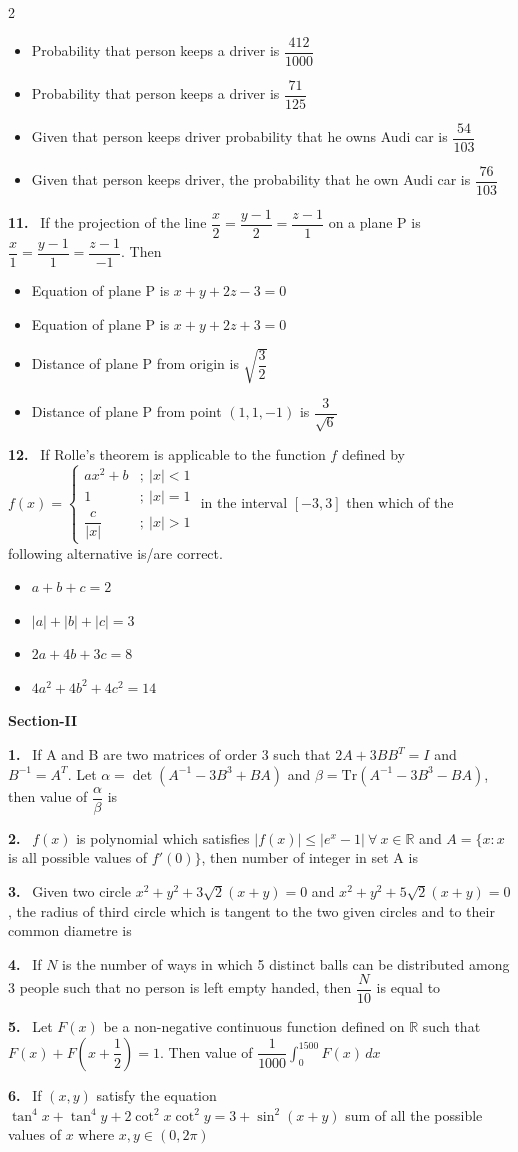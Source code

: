 \documentclass[10pt]{extarticle}
\newcommand{\sect}[1]{\par\smallskip\noindent\textbf{#1}\par}
\newcommand{\qn}[1]{\par\smallskip\noindent\textbf{#1.}~}
\newenvironment{qoptions}{\begin{itemize}[leftmargin=1.8em,itemsep=1pt,topsep=2pt,label={}]}{\end{itemize}}
\newcommand{\opt}[2]{\item[(#1)] #2}
\begin{document}
\begin{multicols}{2}
\begin{qoptions}
\opt{A}{Probability that person keeps a driver is $\dfrac{412}{1000}$}
\opt{B}{Probability that person keeps a driver is $\dfrac{71}{125}$}
\opt{C}{Given that person keeps driver probability that he owns Audi car is $\dfrac{54}{103}$}
\opt{D}{Given that person keeps driver, the probability that he own Audi car is $\dfrac{76}{103}$}
\end{qoptions}
\qn{11} If the projection of the line $\dfrac x2=\dfrac{y-1}{2}=\dfrac{z-1}{1}$ on a plane P is $\dfrac x1=\dfrac{y-1}{1}=\dfrac{z-1}{-1}$. Then
\begin{qoptions}
\opt{A}{Equation of plane P is $x+y+2z-3=0$}
\opt{B}{Equation of plane P is $x+y+2z+3=0$}
\opt{C}{Distance of plane P from origin is $\sqrt{\dfrac32}$}
\opt{D}{Distance of plane P from point $(1,1,-1)$ is $\dfrac{3}{\sqrt6}$}
\end{qoptions}
\qn{12} If Rolle's theorem is applicable to the function $f$ defined by $f(x)=\begin{cases}ax^2+b&;\ |x|<1\\ 1&;\ |x|=1\\ \dfrac{c}{|x|}&;\ |x|>1\end{cases}$ in the interval $[-3,3]$ then which of the following alternative is/are correct.
\begin{qoptions}
\opt{A}{$a+b+c=2$}
\opt{B}{$|a|+|b|+|c|=3$}
\opt{C}{$2a+4b+3c=8$}
\opt{D}{$4a^2+4b^2+4c^2=14$}
\end{qoptions}
\sect{Section-II}
\qn{1} If A and B are two matrices of order 3 such that $2A+3BB^T=I$ and $B^{-1}=A^T$. Let $\alpha=\det(A^{-1}-3B^3+BA)$ and $\beta=\text{Tr}(A^{-1}-3B^3-BA)$, then value of $\dfrac\alpha\beta$ is
\qn{2} $f(x)$ is polynomial which satisfies $|f(x)|\le|e^x-1|\ \forall\ x\in\mathbb R$ and $A=\{x:x$ is all possible values of $f'(0)\}$, then number of integer in set A is
\qn{3} Given two circle $x^2+y^2+3\sqrt2(x+y)=0$ and $x^2+y^2+5\sqrt2(x+y)=0$, the radius of third circle which is tangent to the two given circles and to their common diametre is
\qn{4} If $N$ is the number of ways in which 5 distinct balls can be distributed among 3 people such that no person is left empty handed, then $\dfrac N{10}$ is equal to
\qn{5} Let $F(x)$ be a non-negative continuous function defined on $\mathbb R$ such that $F(x)+F\!\left(x+\dfrac12\right)=1$. Then value of $\dfrac1{1000}\displaystyle\int_0^{1500}F(x)\,dx$
\qn{6} If $(x,y)$ satisfy the equation $\tan^4x+\tan^4y+2\cot^2x\cot^2y=3+\sin^2(x+y)$ sum of all the possible values of $x$ where $x,y\in(0,2\pi)$

\end{multicols}
\end{document}
